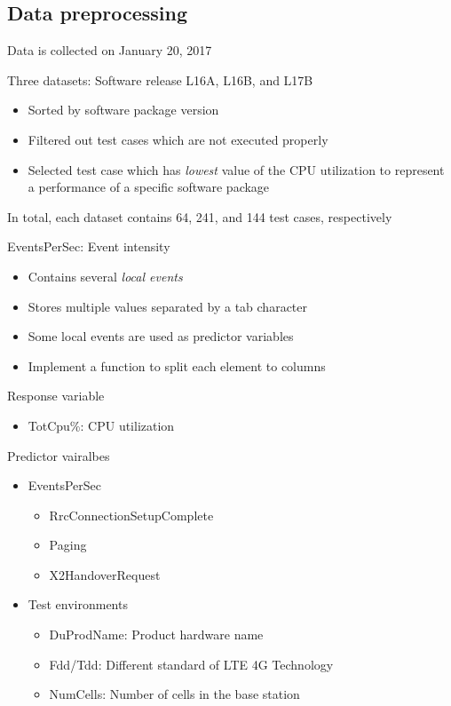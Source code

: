 \documentclass{beamer}
\begin{document}
\subsection{Data preprocessing}
\begin{frame}
Data is collected on January 20, 2017

Three datasets: Software release L16A, L16B, and L17B
\begin{itemize}
	\item Sorted by software package version
	\item Filtered out test cases which are not executed properly
	\item Selected test case which has \textit{lowest} value of the CPU utilization to represent a performance of a specific software package
\end{itemize}

In total, each dataset contains 64, 241, and 144 test cases, respectively

\end{frame}

\begin{frame}
EventsPerSec: Event intensity 
\begin{itemize}
	\item Contains several \textit{local events}
	\item Stores multiple values separated by a tab character
	\item Some local events are used as predictor variables
	\item Implement a function to split each element to columns
\end{itemize}

\end{frame}

\begin{frame}
Response variable 
\begin{itemize}
	\item TotCpu\%: CPU utilization
\end{itemize}	
\vspace{1em}
Predictor vairalbes
\begin{itemize}
	\item EventsPerSec
	\begin{itemize}
		\item RrcConnectionSetupComplete
		\item Paging
		\item X2HandoverRequest
	\end{itemize}	
	\item Test environments
	\begin{itemize}
		\item DuProdName: Product hardware name
		\item Fdd/Tdd: Different standard of LTE 4G Technology
		\item NumCells: Number of cells in the base station
	\end{itemize}
\end{itemize}


\end{frame}
\end{document}
